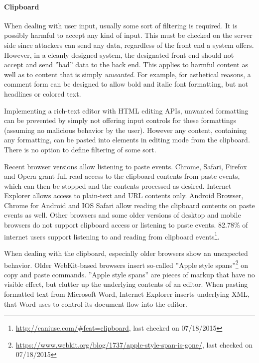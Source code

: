 \paragraph{Clipboard}

When dealing with user input, usually some sort of filtering is required. It is possibly harmful to accept any kind of input. This must be checked on the server side since attackers can send any data, regardless of the front end a system offers. However, in a cleanly designed system, the designated front end should not accept and send ''bad'' data to the back end. This applies to harmful content as well as to content that is simply \textit{unwanted}. For example, for asthetical reasons, a comment form can be designed to allow bold and italic font formatting, but not headlines or colored text.

Implementing a rich-text editor with HTML editing APIs, unwanted formatting can be prevented by simply not offering input controls for these formattings (assuming no malicious behavior by the user). However any content, containing any formatting, can be pasted into elements in editing mode from the clipboard. There is no option to define filtering of some sort.

Recent browser versions allow listening to paste events. Chrome, Safari, Firefox and Opera grant full read access to the clipboard contents from paste events, which can then be stopped and the contents processed as desired. Internet Explorer allows access to plain-text and URL contents only. Android Browser, Chrome for Android and IOS Safari allow reading the clipboard contents on paste events as well. Other browsers and some older versions of desktop and mobile browsers do not support clipboard access or listening to paste events. 82.78\% of internet users support listening to and reading from clipboard events\footnote{\url{http://caniuse.com/\#feat=clipboard}, last checked on 07/18/2015}.

When dealing with the clipboard, especially older browsers show an unexpected behavior. Older WebKit-based browsers insert so-called ''Apple style spans''\footnote{\url{https://www.webkit.org/blog/1737/apple-style-span-is-gone/}, last checked on 07/18/2015} on copy and paste commands. ''Apple style spans'' are pieces of markup that have no visible effect, but clutter up the underlying contents of an editor. When pasting formatted text from Microsoft Word, Internet Explorer inserts underlying XML, that Word uses to control its document flow into the editor.


